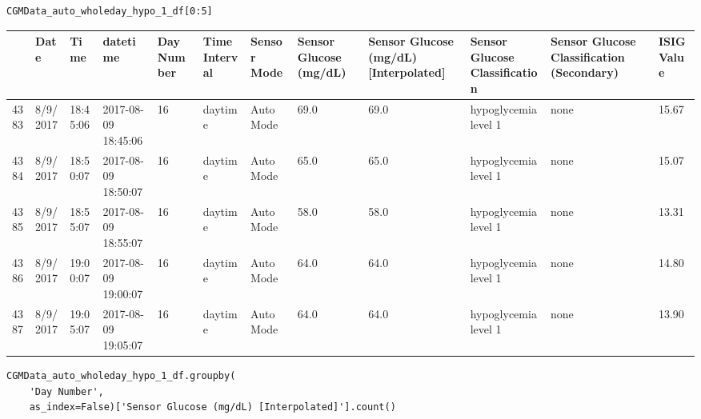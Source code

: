 \bigskip

\begin{verbatim}
CGMData_auto_wholeday_hypo_1_df[0:5]
\end{verbatim}

\bigskip\noindent
\begin{tabular}{p{}p{}p{}p{}p{}p{}p{}p{}p{}p{}p{}p{}}
\toprule
 & Date & Time & datetime & Day Number & Time Interval & Sensor Mode & Sensor Glucose (mg/dL) & Sensor Glucose (mg/dL) [Interpolated] & Sensor Glucose Classification & Sensor Glucose Classification (Secondary) & ISIG Value \\
\hline
4383 & 8/9/2017 & 18:45:06 & 2017-08-09 18:45:06 & 16 & daytime & Auto Mode & 69.0 & 69.0 & hypoglycemia level 1 & none & 15.67 \\
\hline
4384 & 8/9/2017 & 18:50:07 & 2017-08-09 18:50:07 & 16 & daytime & Auto Mode & 65.0 & 65.0 & hypoglycemia level 1 & none & 15.07 \\
\hline
4385 & 8/9/2017 & 18:55:07 & 2017-08-09 18:55:07 & 16 & daytime & Auto Mode & 58.0 & 58.0 & hypoglycemia level 1 & none & 13.31 \\
\hline
4386 & 8/9/2017 & 19:00:07 & 2017-08-09 19:00:07 & 16 & daytime & Auto Mode & 64.0 & 64.0 & hypoglycemia level 1 & none & 14.80 \\
\hline
4387 & 8/9/2017 & 19:05:07 & 2017-08-09 19:05:07 & 16 & daytime & Auto Mode & 64.0 & 64.0 & hypoglycemia level 1 & none & 13.90 \\
\hline
\bottomrule
\end{tabular}

\bigskip

\begin{verbatim}
CGMData_auto_wholeday_hypo_1_df.groupby(
    'Day Number',
    as_index=False)['Sensor Glucose (mg/dL) [Interpolated]'].count()
\end{verbatim}

